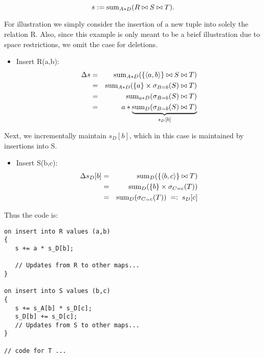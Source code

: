 {\[
s := \mathrm{sum}_{A*D}(R \bowtie S \bowtie T).
\]

For illustration we simply consider the insertion of a new tuple into
solely the relation R. Also, since this example is only meant to be a brief
illustration due to space restrictions, we omit the case for deletions.

\begin{itemize}
\item
Insert R(a,b):
\begin{eqnarray*}
\Delta s &=& \mathrm{sum}_{A*D}(\{{\langle a,b\rangle}\} \bowtie S \bowtie T)
\\ &=&
\mathrm{sum}_{A*D}(\{a\} \times \sigma_{B=b}(S) \bowtie T)
\\ &=&
\mathrm{sum}_{a*D}(\sigma_{B=b}(S) \bowtie T)
\\ &=&
a * \underbrace{\mathrm{sum}_{D}(\sigma_{B=b}(S) \bowtie T)}_{s_D[b]}
\end{eqnarray*}

\end{itemize}

 
Next, we incrementally maintain $s_D[b]$, which in this case is maintained by
insertions into S.

\begin{itemize}
\item
Insert S(b,c):
\begin{eqnarray*}
\Delta s_D[b] &=&
\mathrm{sum}_{D}(\{{\langle b,c\rangle}\} \bowtie T)
\\ &=&
\mathrm{sum}_{D}(\{b\} \times \sigma_{C=c}(T))
\\ &=&
\mathrm{sum}_{D}(\sigma_{C=c}(T))
\;=:\; s_D[c]
\end{eqnarray*}
\end{itemize}

Thus the code is:
\begin{verbatim}
on insert into R values (a,b)
{
   s += a * s_D[b];

   // Updates from R to other maps...
}

on insert into S values (b,c)
{
   s += s_A[b] * s_D[c];
   s_D[b] += s_D[c];
   // Updates from S to other maps...
}

// code for T ...
\end{verbatim}
}
